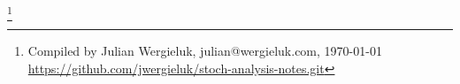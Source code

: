 
\renewcommand*{\thefootnote}{}
\footnote{Compiled by Julian Wergieluk, julian@wergieluk.com, \today\\\url{https://github.com/jwergieluk/stoch-analysis-notes.git}}


